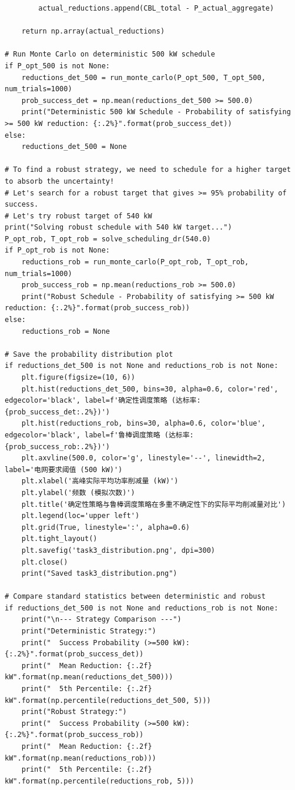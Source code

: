 \documentclass[12pt,a4paper]{article}
\begin{document}
\begin{lstlisting}
        actual_reductions.append(CBL_total - P_actual_aggregate)
        
    return np.array(actual_reductions)

# Run Monte Carlo on deterministic 500 kW schedule
if P_opt_500 is not None:
    reductions_det_500 = run_monte_carlo(P_opt_500, T_opt_500, num_trials=1000)
    prob_success_det = np.mean(reductions_det_500 >= 500.0)
    print("Deterministic 500 kW Schedule - Probability of satisfying >= 500 kW reduction: {:.2%}".format(prob_success_det))
else:
    reductions_det_500 = None

# To find a robust strategy, we need to schedule for a higher target to absorb the uncertainty!
# Let's search for a robust target that gives >= 95% probability of success.
# Let's try robust target of 540 kW
print("Solving robust schedule with 540 kW target...")
P_opt_rob, T_opt_rob = solve_scheduling_dr(540.0)
if P_opt_rob is not None:
    reductions_rob = run_monte_carlo(P_opt_rob, T_opt_rob, num_trials=1000)
    prob_success_rob = np.mean(reductions_rob >= 500.0)
    print("Robust Schedule - Probability of satisfying >= 500 kW reduction: {:.2%}".format(prob_success_rob))
else:
    reductions_rob = None

# Save the probability distribution plot
if reductions_det_500 is not None and reductions_rob is not None:
    plt.figure(figsize=(10, 6))
    plt.hist(reductions_det_500, bins=30, alpha=0.6, color='red', edgecolor='black', label=f'确定性调度策略 (达标率: {prob_success_det:.2%})')
    plt.hist(reductions_rob, bins=30, alpha=0.6, color='blue', edgecolor='black', label=f'鲁棒调度策略 (达标率: {prob_success_rob:.2%})')
    plt.axvline(500.0, color='g', linestyle='--', linewidth=2, label='电网要求阈值 (500 kW)')
    plt.xlabel('高峰实际平均功率削减量 (kW)')
    plt.ylabel('频数 (模拟次数)')
    plt.title('确定性策略与鲁棒调度策略在多重不确定性下的实际平均削减量对比')
    plt.legend(loc='upper left')
    plt.grid(True, linestyle=':', alpha=0.6)
    plt.tight_layout()
    plt.savefig('task3_distribution.png', dpi=300)
    plt.close()
    print("Saved task3_distribution.png")

# Compare standard statistics between deterministic and robust
if reductions_det_500 is not None and reductions_rob is not None:
    print("\n--- Strategy Comparison ---")
    print("Deterministic Strategy:")
    print("  Success Probability (>=500 kW): {:.2%}".format(prob_success_det))
    print("  Mean Reduction: {:.2f} kW".format(np.mean(reductions_det_500)))
    print("  5th Percentile: {:.2f} kW".format(np.percentile(reductions_det_500, 5)))
    print("Robust Strategy:")
    print("  Success Probability (>=500 kW): {:.2%}".format(prob_success_rob))
    print("  Mean Reduction: {:.2f} kW".format(np.mean(reductions_rob)))
    print("  5th Percentile: {:.2f} kW".format(np.percentile(reductions_rob, 5)))
\end{lstlisting}
\end{document}
